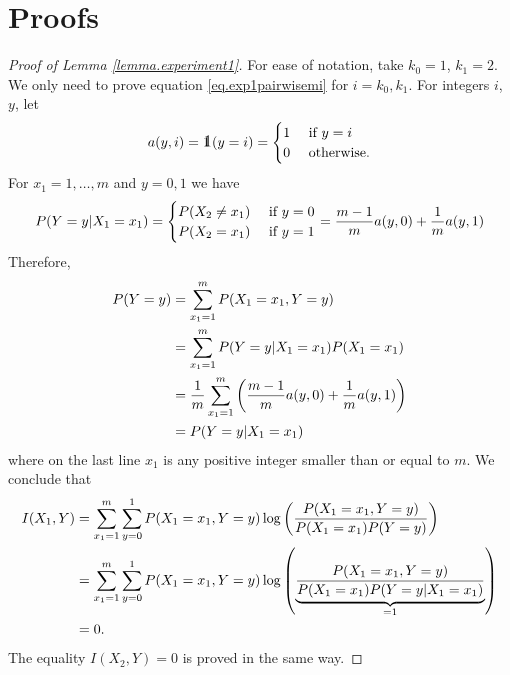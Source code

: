 \section{Proofs}

\begin{proof}[Proof of Lemma \ref{lemma.experiment1}]
	For ease of notation, 
	take 
	$k_0 = 1$, 
	$k_1 = 2$. 
	We only need to prove equation \eqref{eq.exp1pairwisemi}
	for $i = k_0, k_1$. 
	For integers $i$, $y$, 
	let 
	\begin{equation*}
		a(y, i) = \one(y = i) 
		= 
		\begin{cases}
			1 & \text{ if } y = i
			\\
			0 & \text{ otherwise}.
		\end{cases}
	\end{equation*}
	For 
	$x_1 = 1, \dots, m$
	and
	$y = 0, 1$
	we have
	\begin{equation*}
		{{P}}(Y = y \vert X_1 = x_1)
		=
		\begin{cases}
			{{P}}(X_2 \neq x_1) & \text { if } y = 0
			\\
			{{P}}(X_2 = x_1) & \text { if } y = 1
		\end{cases}
		=
		\frac{m-1}{m} a(y, 0)
		+
		\frac{1}{m} a(y, 1)
	\end{equation*}
	Therefore,
	\begin{equation*}
		\begin{split}
			{{P}}(Y = y) 
			& =
			\sum_{x_1 = 1}^{m}
			{{P}}(X_1 = x_1, Y = y)
			\\
			& = 
			\sum_{x_1 = 1}^{m}
			{{P}}(Y = y \vert X_1 = x_1)
			{{P}}(X_1 = x_1)
			\\
			& = 
			\frac{1}{m}
			\sum_{x_1 = 1}^{m}
			\left(
			\frac{m-1}{m} a(y, 0)
			+
			\frac{1}{m} a(y, 1)
			\right)
			\\
			& = 
			{{P}}(Y = y \vert X_1 = x_1)
		\end{split}
	\end{equation*}
	where on the last line $x_1$ is any positive integer smaller than or equal to $m$. 
	We conclude that
	\begin{equation*}
		\begin{split}
		I(X_1, Y)
		& = 
		\sum_{x_1 = 1}^{m}
		\sum_{y=0}^{1}
		{{P}}(X_1 = x_1, Y = y)
		\log
		\left(
		\frac{
		{{P}}(X_1 = x_1, Y = y)
		}
		{
			{{P}}(X_1 = x_1){{P}}(Y=y)
		}
		\right)
		\\
		& = 
		\sum_{x_1 = 1}^{m}
		\sum_{y=0}^{1}
		{{P}}(X_1 = x_1, Y = y)
		\log
		\left(
		\underbrace{
		\frac{
		{{P}}(X_1 = x_1, Y = y)
		}
		{
			{{P}}(X_1 = x_1)
			{{P}}(Y = y \vert X_1 = x_1)
		}
		}_{ = 1}
		\right)
		\\
		& = 
		0.
		\end{split}
	\end{equation*}
	The equality $I(X_2, Y) = 0$ is proved in the same way. 


\end{proof}
